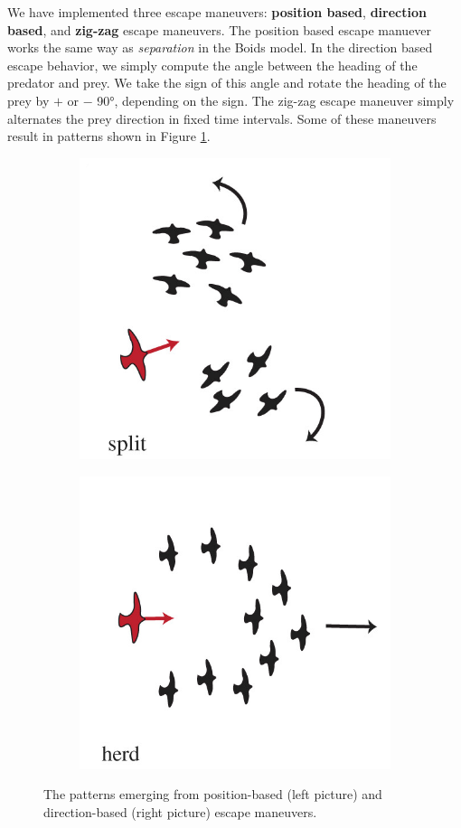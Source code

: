 \documentclass[9pt]{pnas-new}
\begin{document}
We have implemented three escape maneuvers: \textbf{position based}, \textbf{direction based}, and \textbf{zig-zag} escape maneuvers.
The position based escape manuever works the same way as \textit{separation} in the Boids model.
In the direction based escape behavior, we simply compute the angle between the heading of the predator and prey.
We take the sign of this angle and rotate the heading of the prey by $+$ or $-$ 90°, depending on the sign.
The zig-zag escape maneuver simply alternates the prey direction in fixed time intervals.
Some of these maneuvers result in patterns shown in Figure \ref{fig:escape_maneuvers}.
\begin{figure}[h]
    \centering
    \begin{subfigure}[t]{.45\textwidth}
        \centering
        \includegraphics[width=0.6\linewidth]{article_split.png}
    \end{subfigure}%
    \hspace{.5cm} %
    \begin{subfigure}[t]{.45\textwidth}
        \centering
        \includegraphics[width=0.6\linewidth]{article_herd.png}
    \end{subfigure}
    \caption{The patterns emerging from position-based (left picture) and direction-based (right picture) escape maneuvers.}
    \label{fig:escape_maneuvers}
\end{figure}
\end{document}
